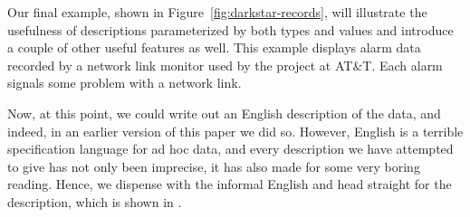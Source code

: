 Our final example, shown in
Figure~\ref{fig:darkstar-records}, will illustrate 
the usefulness of descriptions parameterized by
both types and values and introduce a couple of other
useful features as well.   This example displays
alarm data recorded by a network link monitor
used by the \darkstar{} project at AT\&T.  Each alarm signals some
problem with a network link.  

Now, at this point, we could write out an English description
of the \darkstar{} data, and indeed, in an earlier version of this paper
we did so.  However, English is a terrible specification language
for ad hoc data, and every description we have attempted to give has not 
only been imprecise, it has also made for some very 
boring reading.  Hence, we dispense with the informal
English and head straight for the \datatype{} description,
which is shown in .



